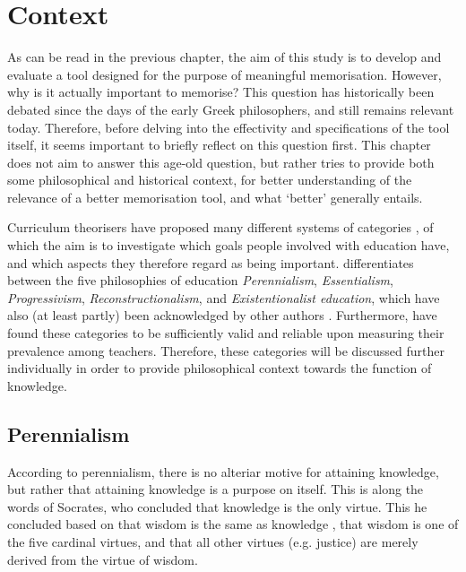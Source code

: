\chapter{Context}

As can be read in the previous chapter, the aim of this study is to develop and evaluate a tool designed for the purpose of meaningful memorisation. However, why is it actually important to memorise? This question has historically been debated since the days of the early Greek philosophers, and still remains relevant today. Therefore, before delving into the effectivity and specifications of the tool itself, it seems important to briefly reflect on this question first. This chapter does not aim to answer this age-old question, but rather tries to provide both some philosophical and historical context, for better understanding of the relevance of a better memorisation tool, and what `better' generally entails.

Curriculum theorisers have proposed many different systems of categories \cite{curriculumtheory}, of which the aim is to investigate which goals people involved with education have, and which aspects they therefore regard as being important.  differentiates between the five philosophies of education \emph{Perennialism}, \emph{Essentialism}, \emph{Progressivism}, \emph{Reconstructionalism}, and \emph{Existentionalist education}, which have also (at least partly) been acknowledged by other authors \cite{educationalphilosophy, educationalphilosophy2, educationalphilosophy3, educationalphilosophy4}. Furthermore,  have found these categories to be sufficiently valid and reliable upon measuring their prevalence among teachers. Therefore, these categories will be discussed further individually in order to provide philosophical context towards the function of knowledge.

\section{Perennialism}

According to perennialism, there is no alteriar motive for attaining knowledge, but rather that attaining knowledge is a purpose on itself. This is along the words of Socrates, who concluded that knowledge is the only virtue. This he concluded based on that wisdom is the same as knowledge \cite{wisdomknowledge}, that wisdom is one of the five cardinal virtues, and that all other virtues (e.g. justice) are merely derived from the virtue of wisdom.

